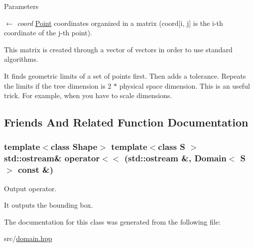 \begin{DoxyParams}{Parameters}
\item[\mbox{$\leftarrow$} {\em coord}]\hyperlink{classPoint}{Point} coordinates organized in a matrix (coord\mbox{[}i, j\mbox{]} is the i-\/th coordinate of the j-\/th point). \par
 This matrix is created through a vector of vectors in order to use standard algorithms.\end{DoxyParams}
It finds geometric limits of a set of points first. Then adds a tolerance. Repeats the limits if the tree dimension is 2 $\ast$ physical space dimension. This is an useful trick. For example, when you have to scale dimensions. 

\subsection{Friends And Related Function Documentation}
\hypertarget{classDomain_ada92a5558513a06e75511c76227bf52c}{
\subsubsection[{operator$<$$<$}]{\setlength{\rightskip}{0pt plus 5cm}template$<$class Shape$>$ template$<$class S $>$ std::ostream\& operator$<$$<$ (std::ostream \&, \/  {\bf Domain}$<$ S $>$ const \&)}}
\label{classDomain_ada92a5558513a06e75511c76227bf52c}
Output operator.

It outputs the bounding box. 

The documentation for this class was generated from the following file:\begin{DoxyCompactItemize}
\item 
src/\hyperlink{domain_8hpp}{domain.hpp}\end{DoxyCompactItemize}
